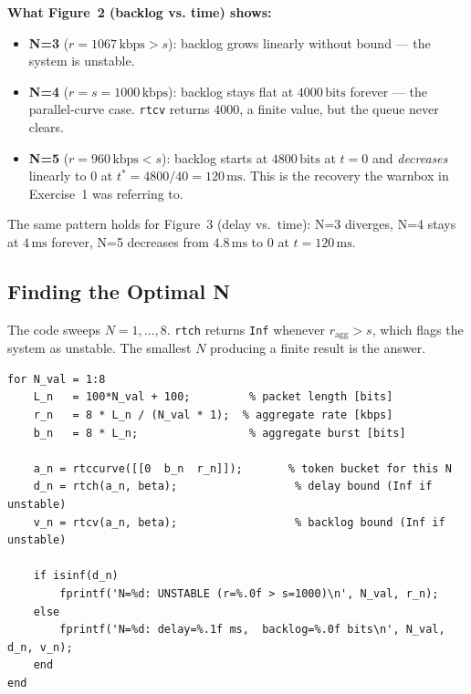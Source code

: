 \documentclass[12pt, a4paper]{article}
\begin{document}
\begin{keybox}
  \textbf{What Figure~2 (backlog vs. time) shows:}
  \begin{itemize}[leftmargin=1.2em, itemsep=3pt]
    \item \textbf{N=3} ($r = 1067\,\text{kbps} > s$): backlog grows linearly
      without bound --- the system is unstable.
    \item \textbf{N=4} ($r = s = 1000\,\text{kbps}$): backlog stays flat at
      $4000\,\text{bits}$ forever --- the parallel-curve case.
      \texttt{rtcv} returns $4000$, a finite value, but the queue never
      clears.
    \item \textbf{N=5} ($r = 960\,\text{kbps} < s$): backlog starts at
      $4800\,\text{bits}$ at $t=0$ and \emph{decreases} linearly to $0$ at
      $t^* = 4800/40 = 120\,\text{ms}$.
      This is the recovery the warnbox in Exercise~1 was referring to.
  \end{itemize}
  The same pattern holds for Figure~3 (delay vs.\ time): N=3 diverges,
  N=4 stays at $4\,\text{ms}$ forever, N=5 decreases from $4.8\,\text{ms}$
  to $0$ at $t = 120\,\text{ms}$.
\end{keybox}

\subsection*{Finding the Optimal N}

The code sweeps $N = 1, \ldots, 8$.
\texttt{rtch} returns \texttt{Inf} whenever $r_\text{agg} > s$, which flags the
system as unstable.
The smallest $N$ producing a finite result is the answer.

\begin{lstlisting}[style=matlab]
for N_val = 1:8
    L_n   = 100*N_val + 100;         % packet length [bits]
    r_n   = 8 * L_n / (N_val * 1);  % aggregate rate [kbps]
    b_n   = 8 * L_n;                 % aggregate burst [bits]

    a_n = rtccurve([[0  b_n  r_n]]);       % token bucket for this N
    d_n = rtch(a_n, beta);                  % delay bound (Inf if unstable)
    v_n = rtcv(a_n, beta);                  % backlog bound (Inf if unstable)

    if isinf(d_n)
        fprintf('N=%d: UNSTABLE (r=%.0f > s=1000)\n', N_val, r_n);
    else
        fprintf('N=%d: delay=%.1f ms,  backlog=%.0f bits\n', N_val, d_n, v_n);
    end
end
\end{lstlisting}
\end{document}
